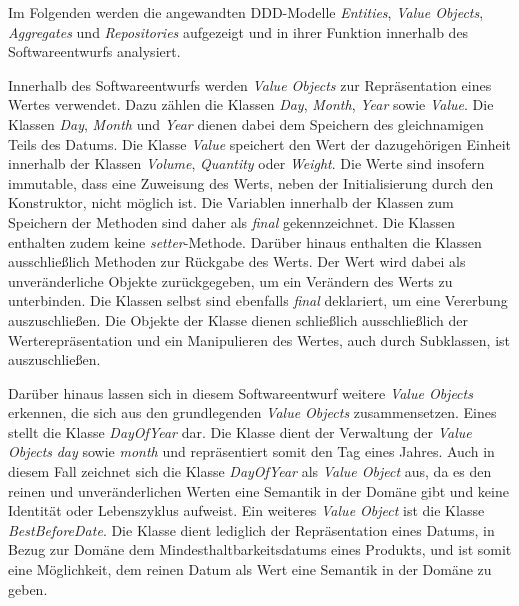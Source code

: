 Im Folgenden werden die angewandten \ac{DDD}-Modelle \textit{Entities}, \textit{Value Objects}, \textit{Aggregates} und \textit{Repositories} aufgezeigt und in ihrer Funktion innerhalb des Softwareentwurfs analysiert.

\label{domaindrivendesign>valueobjects}
Innerhalb des Softwareentwurfs werden \textit{Value Objects} zur Repräsentation eines Wertes verwendet.
Dazu zählen die Klassen \textit{Day}, \textit{Month}, \textit{Year} sowie \textit{Value}.
Die Klassen \textit{Day}, \textit{Month} und \textit{Year} dienen dabei dem Speichern des gleichnamigen Teils des Datums.
Die Klasse \textit{Value} speichert den Wert der dazugehörigen Einheit innerhalb der Klassen \textit{Volume}, \textit{Quantity} oder \textit{Weight}.
Die Werte sind insofern immutable, dass eine Zuweisung des Werts, neben der Initialisierung durch den Konstruktor, nicht möglich ist.
Die Variablen innerhalb der Klassen zum Speichern der Methoden sind daher als \textit{final} gekennzeichnet.
Die Klassen enthalten zudem keine \textit{setter}-Methode.
Darüber hinaus enthalten die Klassen ausschließlich Methoden zur Rückgabe des Werts.
Der Wert wird dabei als unveränderliche Objekte zurückgegeben, um ein Verändern des Werts zu unterbinden.
Die Klassen selbst sind ebenfalls \textit{final} deklariert, um eine Vererbung auszuschließen.
Die Objekte der Klasse dienen schließlich ausschließlich der Werterepräsentation und ein Manipulieren des Wertes, auch durch Subklassen, ist auszuschließen.

Darüber hinaus lassen sich in diesem Softwareentwurf weitere \textit{Value Objects} erkennen, die sich aus den grundlegenden \textit{Value Objects} zusammensetzen.
Eines stellt die Klasse \textit{DayOfYear} dar.
Die Klasse dient der Verwaltung der \textit{Value Objects} \textit{day} sowie \textit{month} und repräsentiert somit den Tag eines Jahres.
Auch in diesem Fall zeichnet sich die Klasse \textit{DayOfYear} als \textit{Value Object} aus, da es den reinen und unveränderlichen Werten eine Semantik in der Domäne gibt und keine Identität oder Lebenszyklus aufweist.
Ein weiteres \textit{Value Object} ist die Klasse \textit{BestBeforeDate}.
Die Klasse dient lediglich der Repräsentation eines Datums, in Bezug zur Domäne dem Mindesthaltbarkeitsdatums eines Produkts, und ist somit eine Möglichkeit, dem reinen Datum als Wert eine Semantik in der Domäne zu geben.

